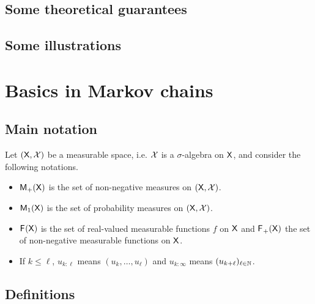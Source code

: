 \documentclass[english,graybox,envcountchap,envcountsame,sectrefs,shortlabels]{svmono}
\theoremstyle{style}
\renewenvironment{keywords}{\textit{\bf Keywords: } \sffamily }{}
\begin{document}
\section{Some theoretical guarantees}

\section{Some illustrations}

\chapter{Basics in Markov chains}
\minitoc


\section{Main notation}

Let $(\mathsf{X},\mathcal{X})$ be a measurable space, i.e.  $\mathcal{X}$ is a $\sigma$-algebra on $\mathsf{X}$, and consider the following notations.
\begin{itemize}
\item $\mathsf{M}_{+}(\mathsf{X})$ is the set of non-negative measures on $(\mathsf{X},\mathcal{X})$.
\item $\mathsf{M}_{1}(\mathsf{X})$ is the set of probability measures on $(\mathsf{X},\mathcal{X})$.
\item $\mathsf{F_{}}(\mathsf{X})$ is the set of real-valued measurable functions
$f$ on $\mathsf{X}$ and $\mathsf{F_{}}_{+}(\mathsf{X})$ the set of non-negative measurable
functions on $\mathsf{X}$.
\item If $k\leq\ell$,  $u_{k:\ell}$ means $(u_{k},\ldots,u_{\ell})$ and $u_{k:\infty}$ means $(u_{k+\ell})_{\ell\in\mathbb{N}}$.
\end{itemize}

\section{Definitions}
\end{document}
